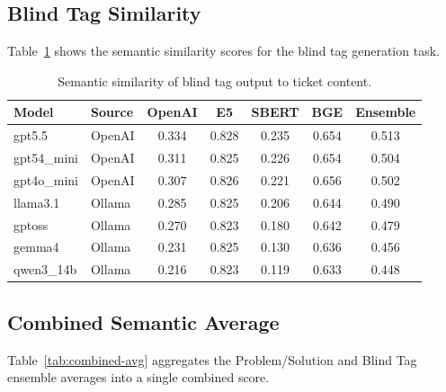 \subsection{Blind Tag Similarity}
%
Table~\ref{tab:semantic-bt} shows the semantic similarity scores for the
blind tag generation task.

\begin{table}[H]
    \centering
    \caption{Semantic similarity of blind tag output to ticket content.}
    \label{tab:semantic-bt}
    \begin{tabular}{llccccc}
        \hline
        \textbf{Model} & \textbf{Source} & \textbf{OpenAI} & \textbf{E5} & \textbf{SBERT} & \textbf{BGE} & \textbf{Ensemble} \\
        \hline
        gpt5.5       & OpenAI & 0.334 & 0.828 & 0.235 & 0.654 & 0.513 \\
        gpt54\_mini  & OpenAI & 0.311 & 0.825 & 0.226 & 0.654 & 0.504 \\
        gpt4o\_mini  & OpenAI & 0.307 & 0.826 & 0.221 & 0.656 & 0.502 \\
        llama3.1     & Ollama & 0.285 & 0.825 & 0.206 & 0.644 & 0.490 \\
        gptoss       & Ollama & 0.270 & 0.823 & 0.180 & 0.642 & 0.479 \\
        gemma4       & Ollama & 0.231 & 0.825 & 0.130 & 0.636 & 0.456 \\
        qwen3\_14b   & Ollama & 0.216 & 0.823 & 0.119 & 0.633 & 0.448 \\
        \hline
    \end{tabular}
\end{table}

\subsection{Combined Semantic Average}
%
Table~\ref{tab:combined-avg} aggregates the Problem/Solution and Blind Tag ensemble
averages into a single combined score.

